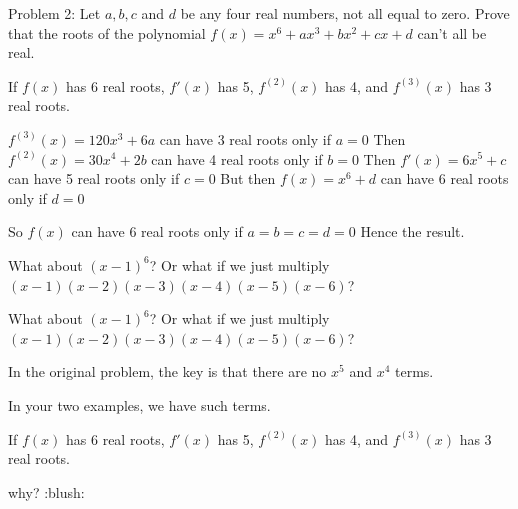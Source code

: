 \begin{solution}
	\begin{tcolorbox}Problem 2:
Let $ a,b,c$ and $ d$ be any four real numbers, not all equal to zero. Prove that the roots of the polynomial $ f(x) = x^{6} + ax^{3} + bx^{2} + cx + d$ can't all be real.\end{tcolorbox}

If $ f(x)$ has 6 real roots, $ f'(x)$ has 5, $ f^{(2)}(x)$ has 4, and $ f^{(3)}(x)$ has 3 real roots.

$ f^{(3)}(x)=120x^3+6a$ can have 3 real roots only if $ a=0$
Then $ f^{(2)}(x)=30x^4+2b$ can have 4 real roots only if $ b=0$
Then $ f'(x)=6x^5+c$ can have 5 real roots only if $ c=0$
But then $ f(x)=x^6+d$ can have 6 real roots only if $ d=0$

So $ f(x)$ can have  6 real roots only if $ a=b=c=d=0$ 
Hence the result.
\end{solution}



\begin{solution}
	What about $ (x - 1)^6$? Or what if we just multiply $ (x-1)(x-2)(x-3)(x-4)(x-5)(x-6)$?
\end{solution}



\begin{solution}
	\begin{tcolorbox}What about $ (x - 1)^6$? Or what if we just multiply $ (x - 1)(x - 2)(x - 3)(x - 4)(x - 5)(x - 6)$?\end{tcolorbox}

In the original problem, the key is that there are no $ x^5$ and $ x^4$ terms.

In your two examples, we have such terms.
\end{solution}



\begin{solution}
	\begin{tcolorbox}
If $ f(x)$ has 6 real roots, $ f'(x)$ has 5, $ f^{(2)}(x)$ has 4, and $ f^{(3)}(x)$ has 3 real roots.

\end{tcolorbox}

why?  :blush:
\end{solution}



